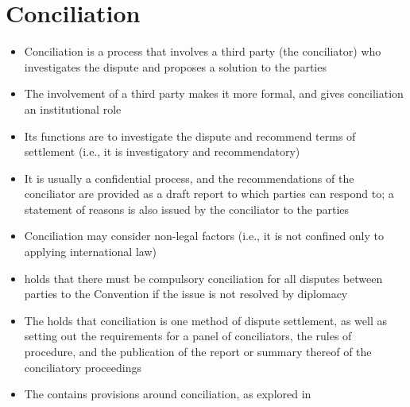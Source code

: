 \section{Conciliation}
\begin{itemize}
    \item Conciliation is a process that involves a third party (the conciliator) who investigates the dispute and proposes a solution to the parties
    \item The involvement of a third party makes it more formal, and gives conciliation an institutional role
    \item Its functions are to investigate the dispute and recommend terms of settlement (i.e., it is investigatory and recommendatory)
    \item It is usually a confidential process, and the recommendations of the conciliator are provided as a draft report to which parties can respond to; a statement of reasons is also issued by the conciliator to the parties
    \item Conciliation may consider non-legal factors (i.e., it is not confined only to applying international law)
    \item {} holds that there must be compulsory conciliation for all disputes between parties to the Convention if the issue is not resolved by diplomacy
    \item The  holds that conciliation is one method of dispute settlement, as well as setting out the requirements for a panel of conciliators, the rules of procedure, and the publication of the report or summary thereof of the conciliatory proceedings
    \item The  contains provisions around conciliation, as explored in 
\end{itemize}


